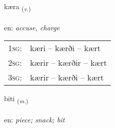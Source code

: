 \documentclass[frontgrid, backgrid]{flacards}\usepackage[]{graphicx}\usepackage[]{xcolor}
\begin{document}
\renewcommand{\flhead}{\vskip5pt \fboxsep=0pt {\small\bfseries\footnotesize Sagnorð | Verb}}
\renewcommand{\fcfoot}{\vskip5pt \fboxsep=0pt \hspace{2pt}{\small\bfseries\footnotesize 3K}}

\renewcommand{\blhead}{\vskip5pt {\small\bfseries\footnotesize Sagnorð | Verb }}
\renewcommand{\bcfoot}{\vskip5pt \hspace{2pt}{\small\bfseries\footnotesize 3K}}


{kæra \small{\textsubscript{(\textit{v.})}} \\[1ex] %
\textphonetic{[cʰaiːra]} \\
en: \emph{accuse, charge} \\  [2ex]
\renewcommand*{\arraystretch}{0.8}
\begin{tabular}{p{1cm}l}
\textsc{1sg}: & kæri -- kærði -- kært \\ 
\textsc{2sg}: & kærir -- kærðir -- kært \\ 
\textsc{3sg}: & kærir -- kærði -- kært \\ 
\end{tabular}
}

\renewcommand{\flhead}{\vskip5pt \fboxsep=0pt {\small\bfseries\footnotesize Nafnorð | Noun}}
\renewcommand{\fcfoot}{\vskip5pt \fboxsep=0pt \hspace{2pt}{\small\bfseries\footnotesize 3K}}

\renewcommand{\blhead}{\vskip5pt {\small\bfseries\footnotesize Nafnorð | Noun }}
\renewcommand{\bcfoot}{\vskip5pt \hspace{2pt}{\small\bfseries\footnotesize 3K}}


{biti \small{\textsubscript{(\textit{m.})}} \\[1ex] %
\textphonetic{[pɪːtɪ]} \\
en: \emph{piece; snack; bit} \\  [2ex]
\renewcommand*{\arraystretch}{0.8}
}
\end{document}

